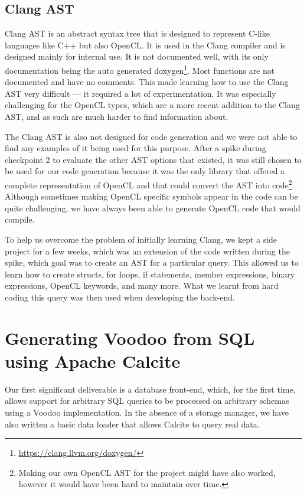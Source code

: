\subsection{Clang AST}\label{clang-ast-noot}

Clang AST is an abstract syntax tree that is designed to represent C-like languages like C++ but also OpenCL. It is used in the Clang compiler and is designed mainly for internal use. It is not documented well, with its only documentation being the auto generated doxygen\footnote{\url{https://clang.llvm.org/doxygen/}}. Most functions are not documented and have no comments. This made learning how to use the Clang AST very difficult — it required a lot of experimentation. It was especially challenging for the OpenCL types, which are a more recent addition to the Clang AST, and as such are much harder to find information about.

The Clang AST is also not designed for code generation and we were not able to find any examples of it being used for this purpose. After a spike during checkpoint 2 to evaluate the other AST options that existed, it was still chosen to be used for our code generation because it was the only library that offered a complete representation of OpenCL and that could convert the AST into code\footnote{Making our own OpenCL AST for the project might have also worked, however it would have been hard to maintain over time.}. Although sometimes making OpenCL specific symbols appear in the code can be quite challenging, we have always been able to generate OpenCL code that would compile.

To help us overcome the problem of initially learning Clang, we kept a side project for a few weeks, which was an extension of the code written during the spike, which goal was to create an AST for a particular query. This allowed us to learn how to create structs, for loops, if statements, member expressions, binary expressions, OpenCL keywords, and many more. What we learnt from hard coding this query was then used when developing the back-end.

\section{Generating Voodoo from SQL using Apache Calcite}
\label{section:sql-to-voodoo}

Our first significant deliverable is a database front-end, which, for the first time, allows support for arbitrary SQL queries to be processed on arbitrary schemas using a Voodoo implementation. In the absence of a storage manager, we have also written a basic data loader that allows Calcite to query real data.

